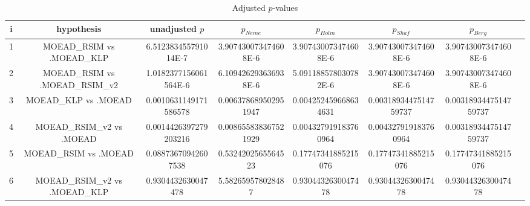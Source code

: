 \documentclass[a4paper,10pt]{article}
\begin{document}
\begin{landscape}
\begin{table}[!htp]
\centering\tiny
\caption{Adjusted $p$-values}
\begin{tabular}{cccccccc}
i&hypothesis&unadjusted $p$&$p_{Neme}$&$p_{Holm}$&$p_{Shaf}$&$p_{Berg}$\\
\hline
1&MOEAD_RSIM vs .MOEAD_KLP&6.512383455791014E-7&3.907430073474608E-6&3.907430073474608E-6&3.907430073474608E-6&3.907430073474608E-6\\
2&MOEAD_RSIM vs .MOEAD_RSIM_v2&1.0182377156061564E-6&6.109426293636938E-6&5.091188578030782E-6&3.907430073474608E-6&3.907430073474608E-6\\
3&MOEAD_KLP vs .MOEAD&0.0010631149171586578&0.006378689502951947&0.004252459668634631&0.0031893447514759737&0.0031893447514759737\\
4&MOEAD_RSIM_v2 vs .MOEAD&0.0014426397279203216&0.008655838367521929&0.004327919183760964&0.004327919183760964&0.0031893447514759737\\
5&MOEAD_RSIM vs .MOEAD&0.08873670942607538&0.5324202565564523&0.17747341885215076&0.17747341885215076&0.17747341885215076\\
6&MOEAD_RSIM_v2 vs .MOEAD_KLP&0.9304432630047478&5.582659578028487&0.9304432630047478&0.9304432630047478&0.9304432630047478\\
\hline
\end{tabular}
\end{table}

\end{landscape}
\end{document}
